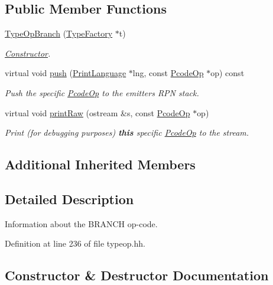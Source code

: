 \subsection*{Public Member Functions}
\begin{DoxyCompactItemize}
\item 
\mbox{\hyperlink{class_type_op_branch_affafc40c625e7d91a8def93bb5e51a66}{Type\+Op\+Branch}} (\mbox{\hyperlink{class_type_factory}{Type\+Factory}} $\ast$t)
\begin{DoxyCompactList}\small\item\em \mbox{\hyperlink{class_constructor}{Constructor}}. \end{DoxyCompactList}\item 
virtual void \mbox{\hyperlink{class_type_op_branch_ac4bf4ae638f9fb5be2521ec278df072b}{push}} (\mbox{\hyperlink{class_print_language}{Print\+Language}} $\ast$lng, const \mbox{\hyperlink{class_pcode_op}{Pcode\+Op}} $\ast$op) const
\begin{DoxyCompactList}\small\item\em Push the specific \mbox{\hyperlink{class_pcode_op}{Pcode\+Op}} to the emitter\textquotesingle{}s R\+PN stack. \end{DoxyCompactList}\item 
virtual void \mbox{\hyperlink{class_type_op_branch_ab0eabba1204d4b84bc6293f9ffb56dbc}{print\+Raw}} (ostream \&s, const \mbox{\hyperlink{class_pcode_op}{Pcode\+Op}} $\ast$op)
\begin{DoxyCompactList}\small\item\em Print (for debugging purposes) {\bfseries{this}} specific \mbox{\hyperlink{class_pcode_op}{Pcode\+Op}} to the stream. \end{DoxyCompactList}\end{DoxyCompactItemize}
\subsection*{Additional Inherited Members}


\subsection{Detailed Description}
Information about the B\+R\+A\+N\+CH op-\/code. 

Definition at line 236 of file typeop.\+hh.



\subsection{Constructor \& Destructor Documentation}
\mbox{\label{class_type_op_branch_affafc40c625e7d91a8def93bb5e51a66}} 
